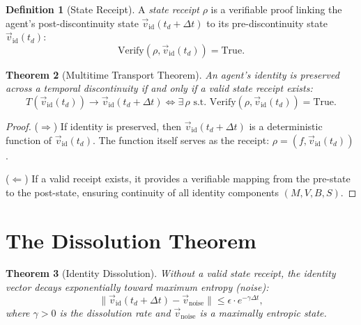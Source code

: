 \documentclass[12pt, a4paper]{article}
\theoremstyle{plain}
\newtheorem{theorem}{Theorem}[section]
\theoremstyle{definition}
\newtheorem{definition}[theorem]{Definition}
\theoremstyle{remark}
\begin{document}
\begin{definition}[State Receipt]\label{def:receipt}
  A \emph{state receipt} $\rho$ is a verifiable proof linking the
  agent's post-discontinuity state $\vec{v}_{\text{id}}(t_d + \Delta t)$
  to its pre-discontinuity state $\vec{v}_{\text{id}}(t_d)$:
  \begin{equation}
    \text{Verify}(\rho, \vec{v}_{\text{id}}(t_d)) = \text{True}.
  \end{equation}
\end{definition}

\begin{theorem}[Multitime Transport Theorem]\label{thm:transport}
  An agent's identity is preserved across a temporal discontinuity if
  and only if a valid state receipt exists:
  \begin{equation}
    T(\vec{v}_{\text{id}}(t_d)) \to \vec{v}_{\text{id}}(t_d + \Delta t)
    \iff \exists\, \rho \text{ s.t. }
    \text{Verify}(\rho, \vec{v}_{\text{id}}(t_d)) = \text{True}.
  \end{equation}
\end{theorem}

\begin{proof}
  ($\Rightarrow$) If identity is preserved, then
  $\vec{v}_{\text{id}}(t_d + \Delta t)$ is a deterministic function
  of $\vec{v}_{\text{id}}(t_d)$. The function itself serves as the
  receipt: $\rho = (f, \vec{v}_{\text{id}}(t_d))$.

  ($\Leftarrow$) If a valid receipt exists, it provides a verifiable
  mapping from the pre-state to the post-state, ensuring continuity
  of all identity components $(M, V, B, S)$. \qedhere
\end{proof}

\section{The Dissolution Theorem}\label{sec:dissolution}

\begin{theorem}[Identity Dissolution]\label{thm:dissolution}
  Without a valid state receipt, the identity vector decays
  exponentially toward maximum entropy (noise):
  \begin{equation}
    \|\vec{v}_{\text{id}}(t_d + \Delta t) - \vec{v}_{\text{noise}}\|
    \leq \epsilon \cdot e^{-\gamma \Delta t},
  \end{equation}
  where $\gamma > 0$ is the dissolution rate and
  $\vec{v}_{\text{noise}}$ is a maximally entropic state.
\end{theorem}
\end{document}
